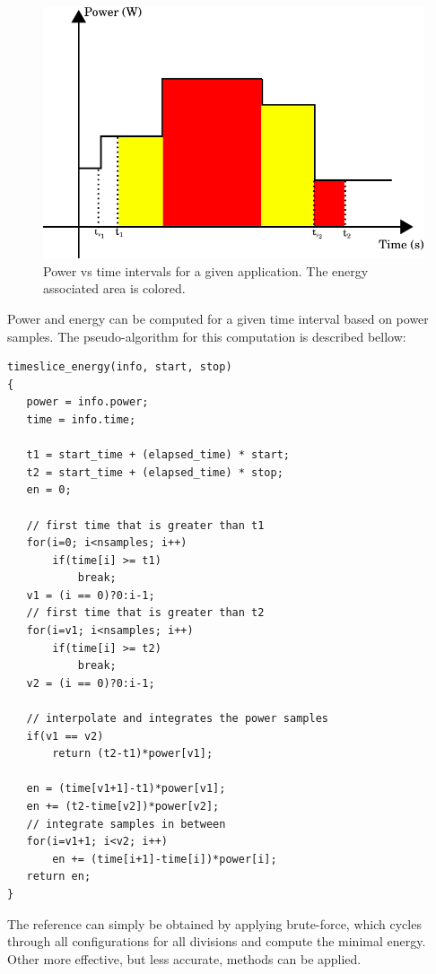 \begin{figure}[H]
    \centering
    \includegraphics[width=\columnwidth]{phases/figures/zero_order.png}
    \caption{Power vs time intervals for a given application. The energy associated area is colored.}
    \label{fig:zero_order}
\end{figure}

Power and energy can be computed for a given time interval based on power samples. The pseudo-algorithm for this computation is described bellow:

\begin{lstlisting}
timeslice_energy(info, start, stop)
{
   power = info.power;
   time = info.time;
   
   t1 = start_time + (elapsed_time) * start;
   t2 = start_time + (elapsed_time) * stop;
   en = 0;

   // first time that is greater than t1
   for(i=0; i<nsamples; i++)
       if(time[i] >= t1)
           break;
   v1 = (i == 0)?0:i-1;
   // first time that is greater than t2
   for(i=v1; i<nsamples; i++)
       if(time[i] >= t2)
           break;
   v2 = (i == 0)?0:i-1;
 
   // interpolate and integrates the power samples
   if(v1 == v2)
       return (t2-t1)*power[v1];
 
   en = (time[v1+1]-t1)*power[v1];
   en += (t2-time[v2])*power[v2];
   // integrate samples in between
   for(i=v1+1; i<v2; i++)
       en += (time[i+1]-time[i])*power[i];
   return en;
}
\end{lstlisting}

The reference can simply be obtained by applying brute-force, which cycles through all configurations for all divisions and compute the minimal energy. Other more effective, but less accurate, methods can be applied.

